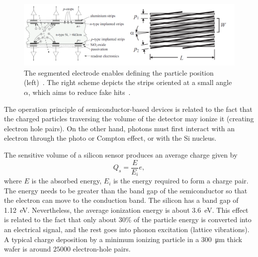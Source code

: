 \begin{figure}[!h]
\centering
\includegraphics[width=0.95\columnwidth]{Chapter2/images/silicons.png}
\caption{The segmented electrode enables defining the particle position (left)~\cite{Sokolov:2006vdx}. The right scheme depicts the strips oriented at a small angle $\alpha$, which aims to reduce fake hits~\cite{Spieler}.}
\label{fig_si}
\end{figure}


The operation principle of semiconductor-based devices is related to the fact that the charged particles traversing the volume of the detector may ionize it (creating electron hole pairs). %
On the other hand, photons must first interact with an electron through the photo or Compton effect, or with the Si nucleus. 

The sensitive volume of a silicon sensor produces an average charge given by 
\begin{equation}
    Q_{s} = \frac{E}{E_{i}}e,
\end{equation}
where $E$ is the absorbed energy, $E_{i}$ is the energy required to form a charge pair. The energy needs to be greater than the band gap of the semiconductor so that the electron can move to the conduction band. The silicon has a band gap of \SI{1.12}{\eV}. Nevertheless, the average ionization energy is about \SI{3.6}{\eV}. This effect is related to the fact that only about $30\%$ of the particle energy is converted into an electrical signal, and the rest goes into phonon excitation (lattice vibrations). A typical charge deposition by a minimum ionizing particle in a \SI{300}{\micro\metre} thick wafer is around $25000$ electron-hole pairs.

